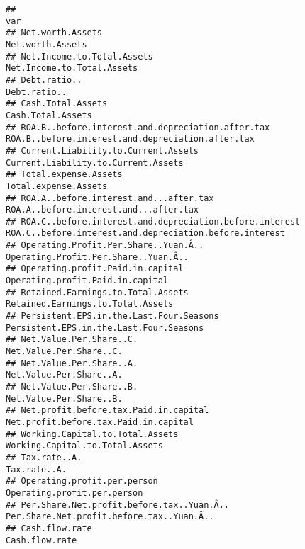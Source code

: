 \documentclass[
]{article}
\begin{document}
\begin{verbatim}
##                                                                                                             var
## Net.worth.Assets                                                                               Net.worth.Assets
## Net.Income.to.Total.Assets                                                           Net.Income.to.Total.Assets
## Debt.ratio..                                                                                       Debt.ratio..
## Cash.Total.Assets                                                                             Cash.Total.Assets
## ROA.B..before.interest.and.depreciation.after.tax             ROA.B..before.interest.and.depreciation.after.tax
## Current.Liability.to.Current.Assets                                         Current.Liability.to.Current.Assets
## Total.expense.Assets                                                                       Total.expense.Assets
## ROA.A..before.interest.and...after.tax                                   ROA.A..before.interest.and...after.tax
## ROA.C..before.interest.and.depreciation.before.interest ROA.C..before.interest.and.depreciation.before.interest
## Operating.Profit.Per.Share..Yuan.Â..                                       Operating.Profit.Per.Share..Yuan.Â..
## Operating.profit.Paid.in.capital                                               Operating.profit.Paid.in.capital
## Retained.Earnings.to.Total.Assets                                             Retained.Earnings.to.Total.Assets
## Persistent.EPS.in.the.Last.Four.Seasons                                 Persistent.EPS.in.the.Last.Four.Seasons
## Net.Value.Per.Share..C.                                                                 Net.Value.Per.Share..C.
## Net.Value.Per.Share..A.                                                                 Net.Value.Per.Share..A.
## Net.Value.Per.Share..B.                                                                 Net.Value.Per.Share..B.
## Net.profit.before.tax.Paid.in.capital                                     Net.profit.before.tax.Paid.in.capital
## Working.Capital.to.Total.Assets                                                 Working.Capital.to.Total.Assets
## Tax.rate..A.                                                                                       Tax.rate..A.
## Operating.profit.per.person                                                         Operating.profit.per.person
## Per.Share.Net.profit.before.tax..Yuan.Â..                             Per.Share.Net.profit.before.tax..Yuan.Â..
## Cash.flow.rate                                                                                   Cash.flow.rate

\end{verbatim}
\end{document}
